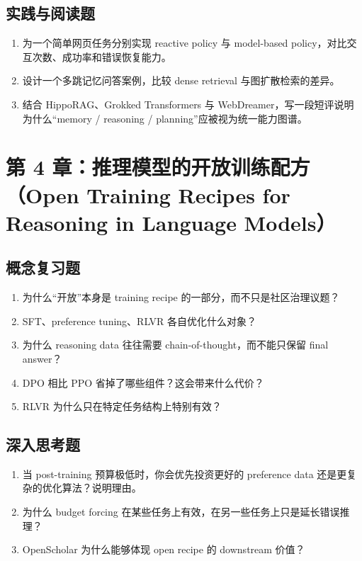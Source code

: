 \subsection*{实践与阅读题}
\begin{enumerate}
\item 为一个简单网页任务分别实现 reactive policy 与 model-based policy，对比交互次数、成功率和错误恢复能力。
\item 设计一个多跳记忆问答案例，比较 dense retrieval 与图扩散检索的差异。
\item 结合 HippoRAG、Grokked Transformers 与 WebDreamer，写一段短评说明为什么“memory / reasoning / planning”应被视为统一能力图谱。
\end{enumerate}

\section{第 4 章：推理模型的开放训练配方（Open Training Recipes for Reasoning in Language Models）}

\subsection*{概念复习题}
\begin{enumerate}
\item 为什么“开放”本身是 training recipe 的一部分，而不只是社区治理议题？
\item SFT、preference tuning、RLVR 各自优化什么对象？
\item 为什么 reasoning data 往往需要 chain-of-thought，而不能只保留 final answer？
\item DPO 相比 PPO 省掉了哪些组件？这会带来什么代价？
\item RLVR 为什么只在特定任务结构上特别有效？
\end{enumerate}

\subsection*{深入思考题}
\begin{enumerate}
\item 当 post-training 预算极低时，你会优先投资更好的 preference data 还是更复杂的优化算法？说明理由。
\item 为什么 budget forcing 在某些任务上有效，在另一些任务上只是延长错误推理？
\item OpenScholar 为什么能够体现 open recipe 的 downstream 价值？
\end{enumerate}

